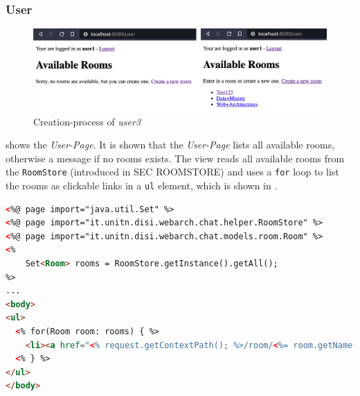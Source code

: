 \subsubsection{User}\label{subsubsec:03_impl_servlets_user}
\begin{figure}[h]
\centering
\includegraphics[scale=0.2]{images/03_impl/user/userpage_before_after}
\caption{Creation-process of \textit{user3}}
\label{fig:03_impl_servlets_user_beforeafter}
\end{figure}
 shows the \textit{User-Page}. It is shown that the \textit{User-Page} lists all available rooms, otherwise a message if no rooms exists.
The view reads all available rooms from the \texttt{RoomStore} (introduced in SEC ROOMSTORE) and uses a \texttt{for} loop to list the rooms as clickable links in a \texttt{ul} element, which is shown in .
\begin{lstlisting}[label=lst:03_impl_servlets_user, caption=List all available rooms, language=html]
<%@ page import="java.util.Set" %>
<%@ page import="it.unitn.disi.webarch.chat.helper.RoomStore" %>
<%@ page import="it.unitn.disi.webarch.chat.models.room.Room" %>
<%
    Set<Room> rooms = RoomStore.getInstance().getAll();
%>
...
<body>
<ul>
  <% for(Room room: rooms) { %>
    <li><a href="<% request.getContextPath(); %>/room/<%= room.getName() %>"><%= room.getName() %></a></li>
  <% } %>
</ul>
</body>
\end{lstlisting}



